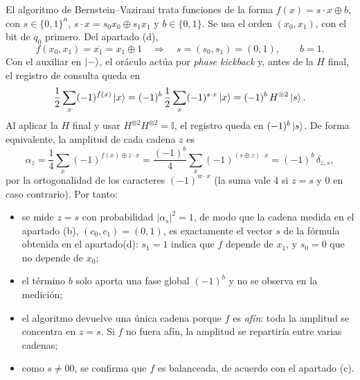 El algoritmo de Bernstein--Vazirani trata funciones de la forma
$f(x)=s\cdot x\oplus b$, con $s\in\{0,1\}^n$, $s\cdot x=s_0x_0\oplus s_1x_1$ y
$b\in\{0,1\}$. Se usa el orden $(x_0,x_1)$, con el bit de $q_0$ primero. Del apartado (d),
\[
  f(x_0,x_1)=\overline{x_1}=x_1\oplus 1
  \quad\Longrightarrow\quad s=(s_0,s_1)=(0,1),\qquad b=1 .
\]
Con el auxiliar en $\ket{-}$, el or\'aculo act\'ua por \emph{phase kickback} y, antes de la
$H$ final, el registro de consulta queda en
\[
  \frac{1}{2}\sum_{x}(-1)^{f(x)}\ket{x}
  =(-1)^{b}\,\frac{1}{2}\sum_{x}(-1)^{s\cdot x}\ket{x}
  =(-1)^{b}\,H^{\otimes 2}\ket{s}.
\]
Al aplicar la $H$ final y usar $H^{\otimes 2}H^{\otimes 2}=\mathbb{I}$, el registro queda en
$(-1)^{b}\ket{s}$. De forma equivalente, la amplitud de cada cadena $z$ es
\[
  \alpha_z=\frac{1}{4}\sum_{x}(-1)^{f(x)\oplus z\cdot x}
  =\frac{(-1)^{b}}{4}\sum_{x}(-1)^{(s\oplus z)\cdot x}
  =(-1)^{b}\,\delta_{z,s},
\]
por la ortogonalidad de los caracteres $(-1)^{w\cdot x}$ (la suma vale $4$ si $z=s$ y $0$
en caso contrario). Por tanto:
\begin{itemize}
  \item se mide $z=s$ con probabilidad $|\alpha_s|^2=1$, de modo que la cadena medida en el apartado (b),
        $(c_0,c_1)=(0,1)$, es exactamente el vector $s$ de la f\'ormula obtenida en el apartado(d):
        $s_1=1$ indica que $f$ depende de $x_1$, y $s_0=0$ que no depende de $x_0$;
  \item el t\'ermino $b$ solo aporta una fase global $(-1)^b$ y no se observa en la medici\'on;
  \item el algoritmo devuelve una \'unica cadena porque $f$ es \emph{af\'in}: toda la amplitud
        se concentra en $z=s$. Si $f$ no fuera af\'in, la amplitud se repartir\'ia entre
        varias cadenas;
  \item como $s\neq 00$, se confirma que $f$ es balanceada, de acuerdo con el apartado (c).
\end{itemize}




